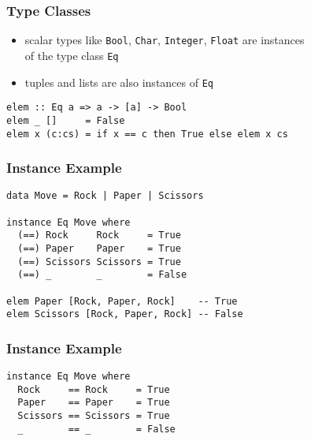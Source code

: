 \documentclass[dvipsnames]{beamer}
\theoremstyle{plain}
\begin{document}
\begin{frame}[fragile]
  \frametitle{Type Classes}

  \begin{itemize}
    \item scalar types like \lstinline|Bool|, \lstinline|Char|,
      \lstinline|Integer|, \lstinline|Float| are instances\\
      of the type class \lstinline|Eq|
    \item tuples and lists are also instances of \lstinline|Eq|
  \end{itemize}

  \pause
  \begin{exampleblock}{}
    \begin{lstlisting}
elem :: Eq a => a -> [a] -> Bool
elem _ []     = False
elem x (c:cs) = if x == c then True else elem x cs
    \end{lstlisting}
  \end{exampleblock}
\end{frame}

\begin{frame}[fragile]
  \frametitle{Instance Example}

  \begin{lstlisting}
data Move = Rock | Paper | Scissors

instance Eq Move where
  (==) Rock     Rock     = True
  (==) Paper    Paper    = True
  (==) Scissors Scissors = True
  (==) _        _        = False

elem Paper [Rock, Paper, Rock]    -- True
elem Scissors [Rock, Paper, Rock] -- False
  \end{lstlisting}
\end{frame}

\begin{frame}[fragile]
  \frametitle{Instance Example}

  \begin{lstlisting}
instance Eq Move where
  Rock     == Rock     = True
  Paper    == Paper    = True
  Scissors == Scissors = True
  _        == _        = False
  \end{lstlisting}
\end{frame}
\end{document}
